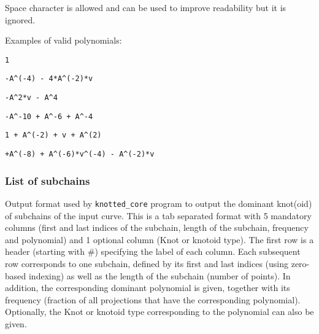 Space character is allowed and can be used to improve readability but it is ignored.

Examples of valid polynomials:
\begin{lstlisting}
1
\end{lstlisting}
\begin{lstlisting}
-A^(-4) - 4*A^(-2)*v
\end{lstlisting}
\begin{lstlisting}
-A^2*v - A^4
\end{lstlisting}
\begin{lstlisting}
-A^-10 + A^-6 + A^-4
\end{lstlisting}
\begin{lstlisting}
1 + A^(-2) + v + A^(2)
\end{lstlisting}
\begin{lstlisting}
+A^(-8) + A^(-6)*v^(-4) - A^(-2)*v
\end{lstlisting}



  
\subsubsection{\label{sec:format:listsubchains}List of subchains}
Output format used by \lstinline{knotted_core} program to output the dominant knot(oid) of subchains of the input curve.
This is a tab separated format with 5 mandatory columns (first and last indices of the subchain, length of the subchain, frequency and polynomial)  and 1 optional column (Knot or knotoid type).
The first row is a header (starting with \#) specifying the label of each column.
Each subsequent row corresponds to one subchain, defined by its first and last indices (using zero-based indexing) as well as the length of the subchain (number of points). In addition, the corresponding dominant polynomial is given, together with its frequency (fraction of all projections that have the corresponding polynomial). Optionally, the Knot or knotoid type corresponding to the polynomial can also be given.

